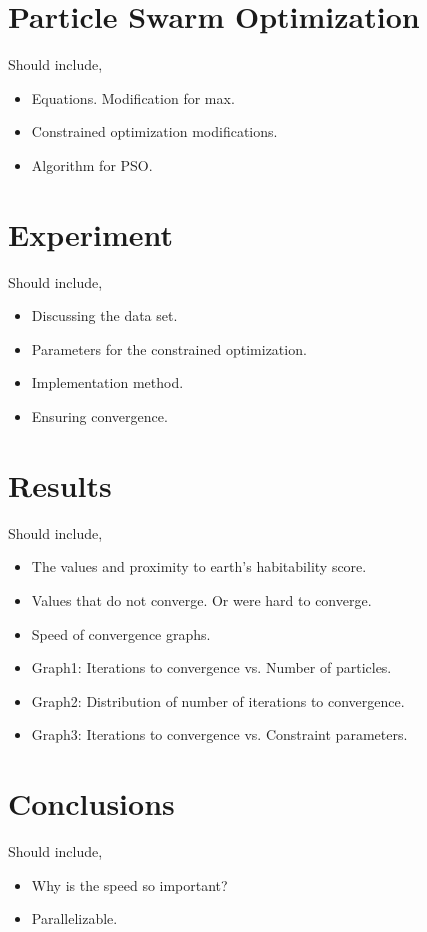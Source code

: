\documentclass{article}
\newenvironment{pointers}{%
  \noindent Should include,
  \begin{itemize}
    \setlength{\itemsep}{-1pt}}{%
\end{itemize}}
\begin{document}


\section{Particle Swarm Optimization}
\begin{pointers}
\item Equations. Modification for max.
\item Constrained optimization modifications.
\item Algorithm for PSO\@.
\end{pointers}


\section{Experiment}
\begin{pointers}
\item Discussing the data set.
\item Parameters for the constrained optimization.
\item Implementation method.
\item Ensuring convergence.
\end{pointers}


\section{Results}
\begin{pointers}
\item The values and proximity to earth's habitability score.
\item Values that do not converge. Or were hard to converge.
\item Speed of convergence graphs.
\item Graph1: Iterations to convergence vs. Number of particles.
\item Graph2: Distribution of number of iterations to convergence.
\item Graph3: Iterations to convergence vs. Constraint parameters.
\end{pointers}


\section{Conclusions}
\begin{pointers}
\item Why is the speed so important?
\item Parallelizable.
\end{pointers}
\end{document}
